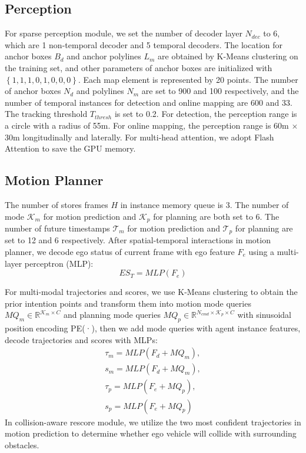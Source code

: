\subsection{Perception}
For sparse perception module, we set the number of decoder layer $N_{dec}$ to 6, which are 1 non-temporal decoder and 5 temporal decoders. The location for anchor boxes $B_{d}$ and anchor polylines $L_{m}$ are obtained by K-Means clustering on the training set, and other parameters of anchor boxes are initialized with $ \left\{1,1,1,0,1,0,0,0\right\} $. Each map element is represented by 20 points. The number of anchor boxes $N_d$ and polylines $N_m$ are set to 900 and 100 respectively, and the number of temporal instances for detection and online mapping are 600 and 33. The tracking threshold $T_{thresh}$ is set to 0.2. For detection, the perception range is a circle with a radius of 55m. For online mapping, the perception range is 60m $\times$ 30m longitudinally and laterally. For multi-head attention, we adopt Flash Attention\cite{flashattention} to  save the GPU memory.

\subsection{Motion Planner}
The number of stores frames $H$ in instance memory queue is 3. The number of mode $\mathcal{K}_m$ for motion prediction and $\mathcal{K}_p$ for planning  are both set to 6. The number of future timestamps $\mathcal{T}_m$ for motion prediction and $\mathcal{T}_p$ for planning are set to 12 and 6 respectively.
After spatial-temporal interactions in motion planner, we decode ego status of current frame with ego feature $F_e$ using a multi-layer perceptron (MLP): 
\begin{equation}
ES_T = MLP(F_e)
\end{equation}

For multi-modal trajectories and scores, we use K-Means clustering to obtain the prior intention points and transform them into motion mode queries $MQ_m \in \mathbb{R}^{\mathcal{K}_m \times C} $ and planning mode queries $MQ_p \in \mathbb{R}^{ N_{cmd} \times \mathcal{K}_p \times C} $ with sinusoidal position encoding PE(·), then we add mode queries with agent instance features, decode trajectories and scores with MLPs:
\begin{gather}
\tau_m = MLP(F_d + MQ_m), \\
s_m = MLP(F_d + MQ_m), \\
\tau_p = MLP(F_e + MQ_p), \\
s_p = MLP(F_e + MQ_p)
\end{gather}
In collision-aware rescore module, we utilize the two most confident trajectories in motion prediction to determine whether ego vehicle will collide with surrounding obstacles.  


